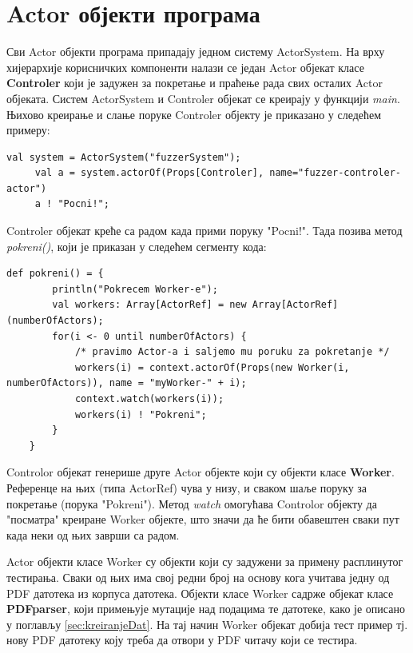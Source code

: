 \documentclass[12pt,oneside]{memoir}
\begin{document}
\section{Actor објекти програма}
\label{sec:actorObj}

Сви Actor објекти програма припадају једном систему ActorSystem. На врху хијерархије корисничких компоненти налази се један Actor објекат класе \textbf{Controler} који је задужен за покретање и праћење рада свих осталих Actor објеката. Систем ActorSystem и Controler објекат се креирају у функцији \textit{main}.  Њихово креирање и слање поруке Controler објекту је приказано у следећем примеру:

\begin{lstlisting}[frame=single]
     val system = ActorSystem("fuzzerSystem");
     val a = system.actorOf(Props[Controler], name="fuzzer-controler-actor")
     a ! "Pocni!";
\end{lstlisting}

Controler објекат креће са радом када прими поруку "Pocni!". Тада позива метод \textit{pokreni()}, који је приказан у следећем сегменту кода:

\begin{lstlisting}[frame=single]
    def pokreni() = {
        println("Pokrecem Worker-e");
        val workers: Array[ActorRef] = new Array[ActorRef](numberOfActors);
        for(i <- 0 until numberOfActors) {
            /* pravimo Actor-a i saljemo mu poruku za pokretanje */
            workers(i) = context.actorOf(Props(new Worker(i, numberOfActors)), name = "myWorker-" + i);
            context.watch(workers(i));
            workers(i) ! "Pokreni";
        }
    }
\end{lstlisting}

Controlor објекат генерише друге Actor објекте који су објекти класе \textbf{Worker}. Референце на њих (типа ActorRef) чува у низу, и сваком шаље поруку за покретање (порука "Pokreni"). Метод \textit{watch} омогућава Controlor објекту да "посматра" креиране Worker објекте, што значи да ће бити обавештен сваки пут када неки од њих заврши са радом.

Actor објекти класе Worker су објекти који су задужени за примену расплинутог тестирања. Сваки од њих има свој редни број на основу кога учитава једну од PDF датотека из корпуса датотека. Објекти класе Worker садрже објекат класе \textbf{PDFparser}, који примењује мутације над подацима те датотеке, како је описано у поглављу \ref{sec:kreiranjeDat}. На тај начин Worker објекат добија тест пример тј. нову PDF датотеку коју треба да отвори у PDF читачу који се тестира.
 
\end{document}
